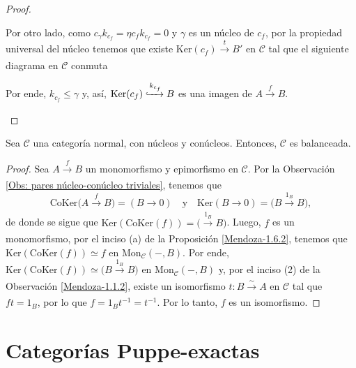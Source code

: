 \documentclass[tesis]{subfiles}
\begin{document}
\begin{proof}
\begin{enumerate}[label=(\alph*)]
\begin{center}
        \end{center}
        Por otro lado, como $c_\gamma k_{c_f} = \eta c_f k_{c_f} = 0$ y $\gamma$ es un núcleo de $c_f$, por la propiedad universal del núcleo tenemos que existe $\text{Ker}(c_f)\xrightarrow[]{t} B'$ en $\mathscr{C}$ tal que el siguiente diagrama en $\mathscr{C}$ conmuta
        \begin{center}
        \end{center}
        Por ende, $k_{c_f} \le \gamma$ y, así, $\text{Ker}(c_f)\xhookrightarrow{k_{c_f}} B$ es una imagen de $A\xrightarrow[]{f}B$.


    \end{enumerate}
\end{proof}

\begin{Prop}\label{Mendoza-1.6.5}
    Sea $\mathscr{C}$ una categoría normal, con núcleos y conúcleos. Entonces, $\mathscr{C}$ es balanceada.
\end{Prop}

\begin{proof}

    Sea $A\xrightarrow[]{f}B$ un monomorfismo y epimorfismo en $\mathscr{C}$. Por la Observación \ref{Obs: pares núcleo-conúcleo triviales}, tenemos que
    \[
        \text{CoKer}\big(A \xrightarrow[]{f} B\big) = (B\to 0) \quad \text{y} \quad \text{Ker}(B\to 0) = \big( B\xrightarrow[]{1_B} B\big),
    \] 
    de donde se sigue que $\text{Ker}(\text{CoKer}(f)) = \big(\xrightarrow[]{1_B}B\big)$. Luego, $f$ es un monomorfismo, por el inciso (a) de la Proposición \ref{Mendoza-1.6.2}, tenemos que $\text{Ker}(\text{CoKer}(f)) \simeq f$ en $\text{Mon}_\mathscr{C}(-,B)$. Por ende, $\text{Ker}(\text{CoKer}(f))\simeq \big(B\xrightarrow[]{1_B}B\big)$ en $\text{Mon}_\mathscr{C}(-,B)$ y, por el inciso (2) de la Observación \ref{Mendoza-1.1.2}, existe un isomorfismo $t:B\xrightarrow[]{\sim} A$ en $\mathscr{C}$ tal que $ft=1_B$, por lo que $f = 1_Bt^{-1} = t^{-1}$. Por lo tanto, $f$ es un isomorfismo.
\end{proof}

\section{Categorías Puppe-exactas} \label{Sec: Categorías Puppe-exactas}
\end{document}
